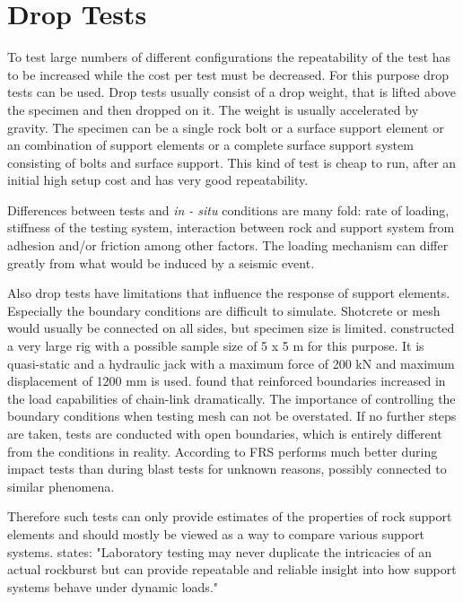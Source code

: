 \section{Drop Tests}
\label{sec:droptest}

To test large numbers of different configurations the repeatability of the test has to be increased while the cost per test must be decreased. For this purpose drop tests can be used.
Drop tests usually consist of a drop weight, that is lifted above the specimen and then dropped on it. The weight is usually accelerated by gravity. The specimen can be a single rock bolt or a surface support element or an combination of support elements or a complete surface support system consisting of bolts and surface support. This kind of test is cheap to run, after an initial high setup cost and has very good repeatability. \autocite{Potvin10} \autocite[84]{Heal10}

Differences between tests and \textit{in - situ} conditions are many fold: rate of loading, stiffness of the testing system, interaction between rock and support system from adhesion and/or friction among other factors. \autocite[35]{Brauner94} The loading mechanism can differ greatly from what would be induced by a seismic event. \autocite[84]{Heal10}

Also drop tests have limitations that influence the response of support elements. Especially the boundary conditions are difficult to simulate. Shotcrete or mesh would usually be connected on all sides, but specimen size is limited. \textcite{Robert19} constructed a very large rig with a possible sample size of 5 x 5 m for this purpose. It is quasi-static and a hydraulic jack with a maximum force of 200 kN and maximum displacement of 1200 mm is used. \textcite{Robert19} found that reinforced boundaries increased in the load capabilities of chain-link dramatically. The importance of controlling the boundary conditions when testing mesh can not be overstated. 
If no further steps are taken, tests are conducted with open boundaries, which is entirely different from the conditions in reality. According to \Textcite[243]{Potvin10} FRS performs much better during impact tests than during blast tests for unknown reasons, possibly connected to similar phenomena.

Therefore such tests can only provide estimates of the properties of rock support elements and should mostly be viewed as a way to compare various support systems. \autocite{Potvin10} \textcite[13]{Simser07} states: "Laboratory testing may never duplicate the intricacies of an actual rockburst but can provide repeatable and reliable insight into how support systems behave under dynamic loads."

